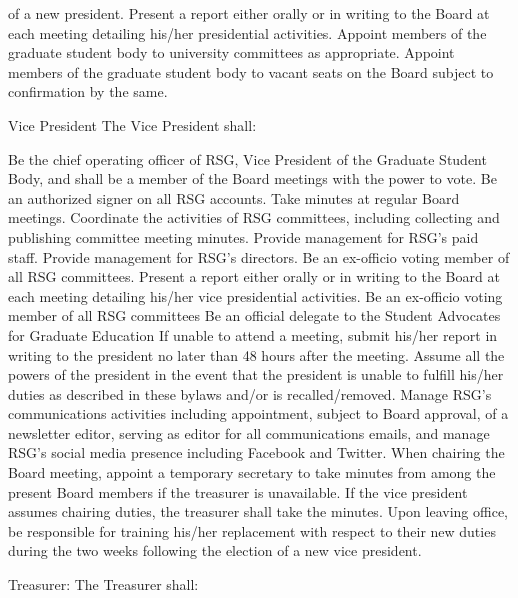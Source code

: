 \begin{enumsubsection}
\begin{enumsubsubsection}
of a new president. 
\itemnotoc Present a report either orally or in writing to the Board at each meeting 
detailing his/her presidential activities. 
\itemnotoc Appoint members of the graduate student body to university committees as appropriate.
\itemnotoc Appoint members of the graduate student body to vacant seats on the 
Board subject to confirmation by the same. 
\end{enumsubsubsection}
\item{Vice President} The Vice President shall:
\begin{enumsubsubsection}
\itemnotoc Be the chief operating officer of RSG, Vice President of the Graduate 
Student Body, and shall be a member of the Board meetings with the 
power to vote. 
\itemnotoc Be an authorized signer on all RSG accounts. 
\itemnotoc Take minutes at regular Board meetings. 
\itemnotoc Coordinate the activities of RSG committees, including collecting and 
publishing committee meeting minutes. 
\itemnotoc Provide management for RSG's paid staff.
\itemnotoc Provide management for RSG's directors.
\itemnotoc Be an ex-officio voting member of all RSG committees. 
\itemnotoc Present a report either orally or in writing to the Board at each meeting 
detailing his/her vice presidential activities. 
\itemnotoc Be an ex-officio voting member of all RSG committees
\itemnotoc Be an official delegate to the Student Advocates for Graduate Education
\itemnotoc If unable to attend a meeting, submit his/her report in writing to the 
president no later than 48 hours after the meeting. Assume all the 
powers of the president in the event that the president is unable to fulfill 
his/her duties as described in these bylaws and/or is recalled/removed. 
\itemnotoc Manage RSG's communications activities including appointment, 
subject to Board approval, of a newsletter editor, serving as editor for 
all communications emails, and manage RSG's social media presence 
including Facebook and Twitter. 
\itemnotoc When chairing the Board meeting, appoint a temporary secretary to 
take minutes from among the present Board members if the treasurer is unavailable. If the vice president assumes chairing duties, the 
treasurer shall take the minutes. 
\itemnotoc Upon leaving office, be responsible for training his/her replacement 
with respect to their new duties during the two weeks following the 
election of a new vice president. 
\end{enumsubsubsection}
\item{Treasurer:} The Treasurer shall:
\begin{enumsubsubsection}

\end{enumsubsubsection}
\end{enumsubsection}
